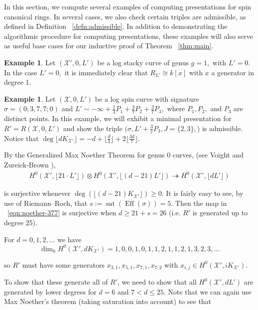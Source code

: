 \documentclass{amsart}
\theoremstyle{plain}
\theoremstyle{definition}
\newtheorem{example}[thm]{Example}
\theoremstyle{remark}
\numberwithin{equation}{section}
\newcommand\sx{\mathscr X}
\newcommand{\halfcan}{L}
\DeclareMathOperator{\Eff}{Eff}
\DeclareMathOperator{\sat}{sat}
\begin{document}
In this section, we compute several examples of computing presentations for spin canonical rings. In several cases, we also check certain triples are admissible, as defined in Definition ~\ref{defn:admissible}. In addition to demonstrating the algorithmic procedure for computing presentations, these examples will also serve as useful base cases for our inductive proof of Theorem ~\ref{thm:main}.

\begin{example}
\label{eg:base-1-0}
Let $(\sx',0, \halfcan')$ be a log stacky curve of genus $g = 1,$ with $\halfcan' = 0$. In the case $\halfcan' = 0,$ it is immediately clear that $R_{\halfcan'} \cong k[x]$ with $x$ a generator in degree 1.
\end{example}


\begin{example}
\label{eg:base-0-377}
Let $(\sx,0, \halfcan')$ be a log spin curve with signature $\sigma =
(0; 3, 7, 7; 0)$ and $\halfcan' \sim -\infty + \frac{1}{3} P_1 +
\frac{3}{7} P_2 + \frac{3}{7} P_3,$ where $P_1,P_2,$ and $P_3$ are
distinct points. In this example, we will exhibit a minimal
presentation for $R' = R(\sx,0, \halfcan')$ and show the triple
$(\sigma, \halfcan' + \frac{3}{7} P_3, J = \{2, 3\},$) is admissible.
Notice that $\deg \lfloor d K_{\sx'} \rfloor= -d + \lfloor \frac{d}{3}
\rfloor + 2 \lfloor \frac{3d}{7} \rfloor$.

By the Generalized Max Noether Theorem for genus 0 curves, (see Voight
and Zureick-Brown \cite[Lemma 3.1.1]{vzb:stacky}),
\begin{align}
\label{eqn:noether-377}
	H^0 (\sx', \lfloor 21 \cdot \halfcan' \rfloor) \otimes H^0 (\sx', \lfloor
	(d - 21) \halfcan' \rfloor) \twoheadrightarrow H^0 (\sx', \lfloor
	d \halfcan' \rfloor)
\end{align}

\noindent
is surjective whenever $\deg (\lfloor (d - 21) K_{\sx'} \rfloor)
\geq 0$. It is fairly easy to see, by use of Riemann--Roch, that
$s := \sat(\Eff(\sigma)) = 5$. Then the map in
~\eqref{eqn:noether-377} is surjective when $d \geq 21 + s = 26$
(i.e. $R'$ is generated up to degree 25).

For $d = 0, 1, 2, \ldots$ we have
\[
	\dim_k H^0 (\sx', d K_{\sx'}) = 1, 0, 0, 1, 0, 1, 1, 2, 1, 1, 2, 1, 3, 2, 3, \ldots
\]

\noindent
so $R'$ must have some generators $x_{3, 1}, x_{5, 1}, x_{7, 1},
x_{7, 2}$ with $x_{i, j} \in H^0(\sx', i K_{\sx'})$.

To show that these generate all of $R'$, we need to show that all
$H^0 (\sx', d \halfcan')$ are generated by lower degrees for $d = 6$
and $7 < d \leq 25$. Note that we can again use Max Noether's theorem
(taking saturation into account) to see that


\end{example}
\end{document}

